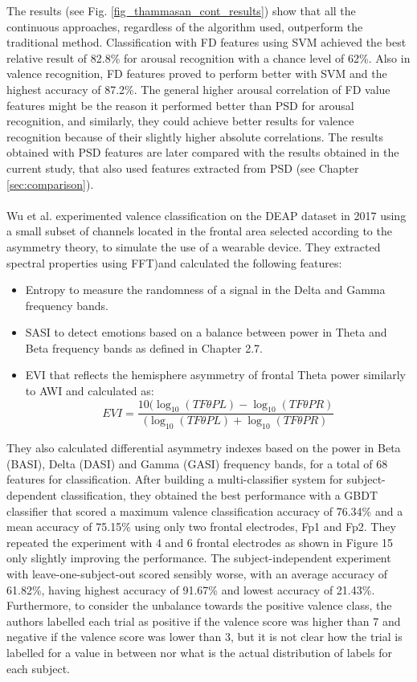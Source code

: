 The results (see Fig. \ref{fig_thammasan_cont_results}) show that all the continuous approaches, regardless of the algorithm used, outperform the traditional method. Classification with \ac{FD} features using \ac{SVM} achieved the best relative result of 82.8\% for arousal recognition with a chance level of 62\%. Also in valence recognition, \ac{FD} features proved to perform better with \ac{SVM} and the highest accuracy of 87.2\%. The general higher arousal correlation of \ac{FD} value features might be the reason it performed better than \ac{PSD} for arousal recognition, and similarly, they could achieve better results for valence recognition because of their slightly higher absolute correlations. The results obtained with \ac{PSD} features are later compared with the results obtained in the current study, that also used features extracted from \ac{PSD} (see Chapter \ref{sec:comparison}).
\\
\\
Wu et al. \cite{wu_estimation_2017}  experimented valence classification on the DEAP dataset \cite{koelstra_deap_2012} in 2017 using a small subset of channels located in the frontal area selected according to the asymmetry theory, to simulate the use of a wearable device.
They extracted spectral properties using \ac{FFT})and calculated the following features:
\begin{itemize}
\item 	Entropy to measure the randomness of a signal in the Delta and Gamma frequency bands.
\item 	\ac{SASI} to detect emotions based on a balance between power in Theta and Beta frequency bands as defined in Chapter 2.7.
\item 	\ac{EVI} that reflects the hemisphere asymmetry of frontal Theta power similarly to \ac{AWI} and  calculated as: \[EVI=\frac{10(\log_{10}(TF\theta PL) - \log_{10}(TF\theta PR)}{(\log_{10}(TF\theta PL) + \log_{10}(TF\theta PR)}\]
\end{itemize}
They also calculated differential asymmetry indexes based on the power in Beta (BASI), Delta (DASI) and Gamma (GASI) frequency bands, for a total of 68 features for classification. After building a multi-classifier system for subject-dependent classification, they obtained the best performance with a \ac{GBDT} classifier that scored a maximum valence classification accuracy of 76.34\% and a mean accuracy of 75.15\% using only two frontal electrodes, Fp1 and Fp2. They repeated the experiment with 4 and 6 frontal electrodes as shown in Figure 15 only slightly improving the performance.  The subject-independent experiment with leave-one-subject-out scored sensibly worse, with an average accuracy of 61.82\%, having highest accuracy of 91.67\% and lowest accuracy of 21.43\%. Furthermore, to consider the unbalance towards the positive valence class, the authors labelled each trial as positive if the valence score was higher than 7 and negative if the valence score was lower than 3, but it is not clear how the trial is labelled for a value in between nor what is the actual distribution of labels for each subject.

